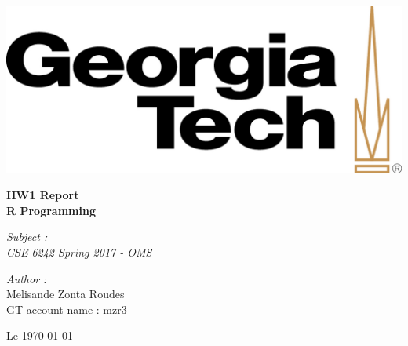 \documentclass{article}
\begin{document}

\graphicspath{{/Users/jacquelineroudes/Documents/GTL_courses/Data_Visual_Analytics}}
\begin{titlepage}

\begin{center}
\includegraphics[scale=0.4]{GT_logo.jpeg}
\end{center}
\hrulefill
\begin{center}\bfseries\huge
   HW1 Report \\
    R Programming\\
    \hrulefill
\end{center}
\vspace*{1cm}
\begin{minipage}[t]{0.4\textwidth}
  \begin{flushleft} \large
    \emph{Subject : \\
    CSE 6242 Spring 2017 - OMS}\\
  \end{flushleft}
\end{minipage}
\begin{minipage}[t]{0.6\textwidth}
  \begin{flushright} \large
    \emph{Author :} \\
    Melisande Zonta Roudes \\
    GT account name : mzr3 \\
  \end{flushright}
\end{minipage}
\begin{flushright}
       Le \today 
\end{flushright} 

\end{titlepage}
\end{document}
